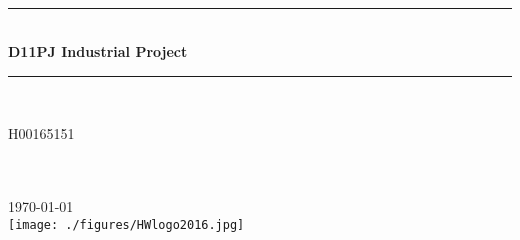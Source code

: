 \documentclass[12pt, oneside]{Thesis} %
\begin{document}
\frontmatter %


\fancyhead{} %
\rhead{\thepage} %
\lhead{} %

\pagestyle{fancy} %

\newcommand{\HRule}{\rule{\linewidth}{0.5mm}} %

\hypersetup{pdfsubject=\subjectname}
\hypersetup{pdfauthor=\authornames}
\hypersetup{pdfkeywords=\keywordnames}


\begin{titlepage}
\begin{center}

\textsc{\LARGE \univname}\\[1.5cm] %

\HRule \\[0.4cm] %
{\LARGE \bfseries {D11PJ Industrial Project}}\\[0.4cm] %
\HRule \\[1.5cm] %
 
\vfill
 
H00165151
\\ \authornames %
 
\large \textit{\degreename}\\[0.3cm] %

\deptname\\[1cm] %
 
{\large {} \today}\\[1cm] %
\texttt{[image: ./figures/HWlogo2016.jpg]} %
 
\vfill
\end{center}

\end{titlepage}
\end{document}

